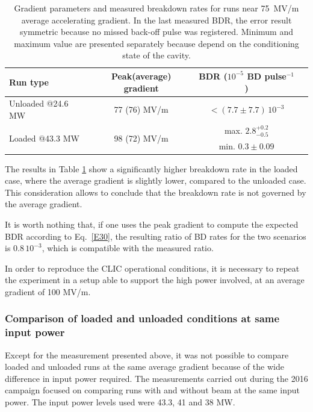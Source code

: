 \begin{table}[h]
  \centering
    \begin{tabular}{ l c c c }
    \toprule
    Run type							&		Peak(average) gradient  			& BDR ($10^{-5}$ BD pulse$^{-1}$)	\\
    \midrule
    Unloaded	@24.6 MW 				&		77 (76) MV/m				&	$< (7.7 \pm 7.7) \, 10^{-3} $ 			\\
    \multirow{ 2}{*}{Loaded  @43.3 MW} 		&		\multirow{ 2}{*}{98 (72) MV/m} 	& 	max. $2.8^{+0.2} _{-0.5}$    		\\
    									&									&	min. $0.3\pm0.09$	\\
    \bottomrule
    \end{tabular}
\caption{Gradient parameters and measured breakdown rates for runs near 75~MV/m average accelerating gradient. In the last measured BDR, the error result symmetric because no missed back-off pulse was registered. Minimum and maximum value are presented separately because depend on the conditioning state of the cavity.}
\label{comp_avg75}
\end{table}

The results in Table \ref{comp_avg75} show a significantly higher breakdown rate in the loaded case, where the average gradient is slightly lower, compared to the unloaded case. This consideration allows to conclude that the breakdown rate is not governed by the average gradient.

It is worth nothing that, if one uses the peak gradient to compute the expected BDR according to Eq.~\ref{E30}, the resulting ratio of BD rates for the two scenarios is $0.8\,10^{-3}$, which is compatible with the measured ratio.

In order to reproduce the CLIC operational conditions, it is necessary to repeat the experiment in a setup able to support the high power involved, at an average gradient of 100 MV/m.



\subsubsection{Comparison of loaded and unloaded conditions at same input power}

Except for the measurement presented above, it was not possible to compare loaded and unloaded runs at the same average gradient because of the wide difference in input power required. The measurements carried out during the 2016 campaign focused on comparing runs with and without beam at the same input power.  The input power levels used were 43.3, 41 and 38 MW. 

